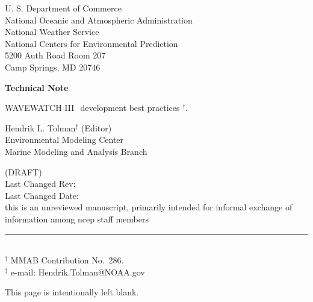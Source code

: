 \documentclass[12pt]{article}
\newcommand{\pstyle}{plain}
\newcommand{\wwt}{WAVEWATCH III$\:$\textsuperscript\textregistered}
\newcommand{\bpage}{\vfill \pagebreak \strut

\vspace{2.5in} \centerline{This page is intentionally left blank.}}
\begin{document}

\pagestyle{empty}

\strut \vspace{5mm}

\begin{center} 
U. S. Department of Commerce \\
National Oceanic and Atmospheric Administration \\
National Weather Service \\
National Centers for Environmental Prediction \\
5200 Auth Road Room 207 \\
Camp Springs, MD 20746

\vspace{15mm}

{\bf Technical Note}

\vspace{15mm}

{\large \wwt\ development best practices $^\dag$.}

\vspace{20mm}

Hendrik L. Tolman$^\ddag$ (Editor)
\\
Environmental Modeling Center \\
Marine Modeling and Analysis Branch

\vspace{25mm}

(DRAFT) \\
Last Changed Rev: \SVNRevision \\
Last Changed Date: \SVNDate \\
\vspace{\baselineskip}
\vfill {\sc this is an unreviewed manuscript, primarily
intended for informal exchange of information among ncep staff
members}

\end{center}
\noindent \rule{140mm}{0.5mm} \\
{\small $^\dag$ MMAB Contribution No.~286. \\
$^\ddag$ e-mail: Hendrik.Tolman@NOAA.gov} \\

\bpage

\pagebreak

\pagestyle{\pstyle}
\setcounter{page}{1}
\end{document}
